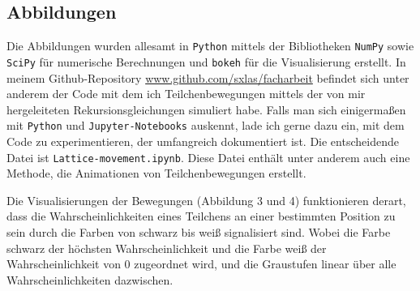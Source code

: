 \documentclass[a4paper,12pt,ngerman]{scrartcl}
\theoremstyle{plain}
\theoremstyle{plain}
\theoremstyle{plain}
\theoremstyle{plain}
\begin{document}
%


\subsection{Abbildungen}
{
Die Abbildungen wurden allesamt in \texttt{Python} mittels der Bibliotheken \texttt{NumPy} sowie \texttt{SciPy} für numerische Berechnungen und \texttt{bokeh} für die Visualisierung erstellt. In meinem Github-Repository \url{www.github.com/sxlas/facharbeit} befindet sich unter anderem der Code mit dem ich Teilchenbewegungen mittels der von mir hergeleiteten Rekursionsgleichungen simuliert habe. Falls man sich einigermaßen mit \texttt{Python} und \texttt{Jupyter-Notebooks} auskennt, lade ich gerne dazu ein, mit dem Code zu experimentieren, der umfangreich dokumentiert ist. Die entscheidende Datei ist \texttt{Lattice-movement.ipynb}. Diese Datei enthält unter anderem auch eine Methode, die Animationen von Teilchenbewegungen erstellt.

Die Visualisierungen der Bewegungen (Abbildung 3 und 4) funktionieren derart, dass die Wahrscheinlichkeiten eines Teilchens an einer bestimmten Position zu sein durch die Farben von schwarz bis weiß signalisiert sind. Wobei die Farbe schwarz der höchsten Wahrscheinlichkeit und die Farbe weiß der Wahrscheinlichkeit von 0 zugeordnet wird, und die Graustufen linear über alle Wahrscheinlichkeiten dazwischen.

}
\vspace{2cm}
\end{document}
